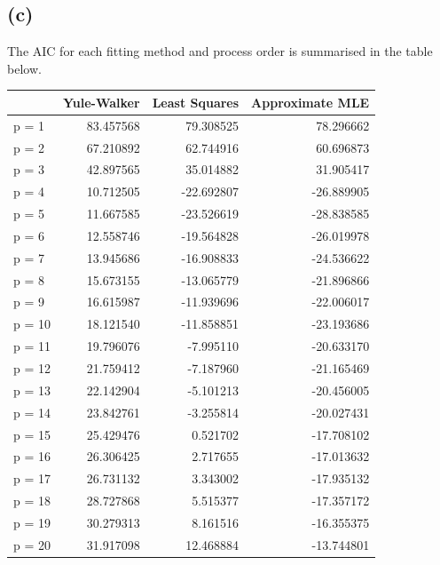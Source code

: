 \documentclass[a4paper,10pt]{article}
\theoremstyle{mytheor}
\begin{document}
\subsection*{(c)}

The AIC for each fitting method and process order is summarised in the table below. \\

\begin{tabular}{lrrr}
\toprule
{} &  Yule-Walker &  Least Squares &  Approximate MLE \\
\midrule
p = 1  &    83.457568 &      79.308525 &        78.296662 \\
p = 2  &    67.210892 &      62.744916 &        60.696873 \\
p = 3  &    42.897565 &      35.014882 &        31.905417 \\
p = 4  &    10.712505 &     -22.692807 &       -26.889905 \\
p = 5  &    11.667585 &     -23.526619 &       -28.838585 \\
p = 6  &    12.558746 &     -19.564828 &       -26.019978 \\
p = 7  &    13.945686 &     -16.908833 &       -24.536622 \\
p = 8  &    15.673155 &     -13.065779 &       -21.896866 \\
p = 9  &    16.615987 &     -11.939696 &       -22.006017 \\
p = 10 &    18.121540 &     -11.858851 &       -23.193686 \\
p = 11 &    19.796076 &      -7.995110 &       -20.633170 \\
p = 12 &    21.759412 &      -7.187960 &       -21.165469 \\
p = 13 &    22.142904 &      -5.101213 &       -20.456005 \\
p = 14 &    23.842761 &      -3.255814 &       -20.027431 \\
p = 15 &    25.429476 &       0.521702 &       -17.708102 \\
p = 16 &    26.306425 &       2.717655 &       -17.013632 \\
p = 17 &    26.731132 &       3.343002 &       -17.935132 \\
p = 18 &    28.727868 &       5.515377 &       -17.357172 \\
p = 19 &    30.279313 &       8.161516 &       -16.355375 \\
p = 20 &    31.917098 &      12.468884 &       -13.744801 \\
\bottomrule
\end{tabular} \\
\end{document}
